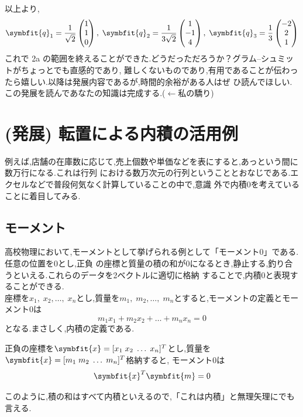 以上より,
\[\displaystyle
\symbfit{q}_1=\frac{1}{\sqrt{2}}\begin{pmatrix}1\\1\\0\end{pmatrix},\;
\symbfit{q}_2=\frac{1}{3\sqrt{2}}\begin{pmatrix}1\\-1\\4\end{pmatrix},\;
\symbfit{q}_3=\frac{1}{3}\begin{pmatrix} -2 \\ 2 \\1 \end{pmatrix}
\]
これで 2a の範囲を終えることができた.どうだっただろうか？グラム--シュミットがちょっとでも直感的であり,
難しくないものであり,有用であることが伝わったら嬉しい.以降は発展内容であるが,時間的余裕がある人はぜ
ひ読んでほしい.この発展を読んであなたの知識は完成する.($\leftarrow$私の驕り)
\section{(発展) 転置による内積の活用例}\label{sec:ad_inner}
例えば,店舗の在庫数に応じて,売上個数や単価などを表にすると,あっという間に数万行になる.これは行列
における数万次元の行列ということとおなじである.エクセルなどで普段何気なく計算していることの中で,意識
外で内積0を考えていることに着目してみる.
\subsection{モーメント}
高校物理において,モーメントとして挙げられる例として「モーメント0」である.任意の位置を0とし,正負
の座標と質量の積の和が0になるとき,静止する,釣り合うといえる.これらのデータを2ベクトルに適切に格納
することで,内積0と表現することができる.\\
座標を$x_1,\;x_2,\dots,\;x_n$とし,質量を$m_1,\;m_2,\dots,\;m_n$とすると,モーメントの定義とモーメント0は
\[
    m_1x_1+m_2x_2+\dots+m_nx_n=0
\]
となる.まさしく,内積の定義である.
\begin{tcolorbox}[colframe=black!80,colback=white,title=モーメントにおける内積0]
    正負の座標を$\symbfit{x}=[x_1\;x_2\;\dots\;x_n]^T$とし,質量を$\symbfit{x}=[m_1\;m_2\;\dots\;m_n]^T$格納すると,
    モーメント0は
    \[
    \symbfit{x}^T\symbfit{m}=0
    \]
\end{tcolorbox}
このように,積の和はすべて内積といえるので,「これは内積」と無理矢理にでも言える.
